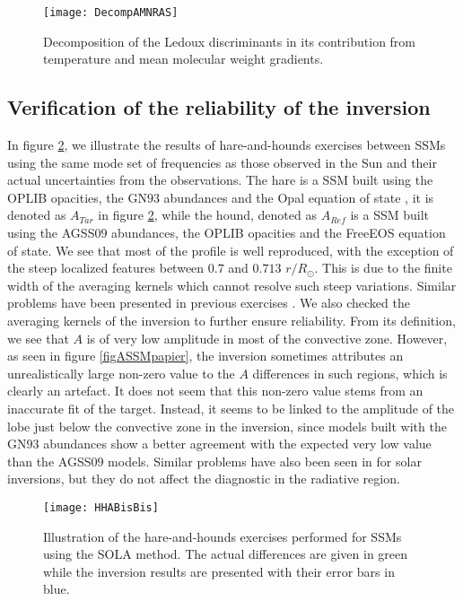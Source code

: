\documentclass[a4paper,fleqn,usenatbib]{mnras}
\begin{document}
\begin{figure}
	\centering
		\texttt{[image: DecompAMNRAS]}
	\caption{Decomposition of the Ledoux discriminants in its contribution from temperature and mean molecular weight gradients. }
		\label{figADecomp}
\end{figure}

\subsection{Verification of the reliability of the inversion}

	 In figure \ref{figHH}, we illustrate the results of hare-and-hounds exercises between SSMs using the same mode set of frequencies as those observed in the Sun and their actual uncertainties from the observations. The hare is a SSM built using the OPLIB opacities, the GN$93$ abundances and the Opal equation of state \citep{Rogerseos}, it is denoted as $A_{Tar}$ in figure \ref{figHH}, while the hound, denoted as $A_{Ref}$ is a SSM built using the AGSS$09$ abundances, the OPLIB opacities and the FreeEOS equation of state. We see that most of the profile is well reproduced, with the exception of the steep localized features between $0.7$ and $0.713$ $r/R_{\odot}$. This is due to the finite width of the averaging kernels which cannot resolve such steep variations. Similar problems have been presented in previous exercises \citep{KosovReview}. We also checked the averaging kernels \citep[see][for details]{Pijpers} of the inversion to further ensure reliability. From its definition, we see that $A$ is of very low amplitude in most of the convective zone. However, as seen in figure \ref{figASSMpapier}, the inversion sometimes attributes an unrealistically large non-zero value to the $A$ differences in such regions, which is clearly an artefact. It does not seem that this non-zero value stems from an inaccurate fit of the target. Instead, it seems to be linked to the amplitude of the lobe just below the convective zone in the inversion, since models built with the GN$93$ abundances show a better agreement with the expected very low value than the AGSS$09$ models. Similar problems have also been seen in \cite{KosovReview} for solar inversions, but they do not affect the diagnostic in the radiative region.

\begin{figure}
	\centering
		\texttt{[image: HHABisBis]}
	\caption{Illustration of the hare-and-hounds exercises performed for SSMs using the SOLA method. The actual differences are given in green while the inversion results are presented with their error bars in blue.}
		\label{figHH}
\end{figure}
\end{document}
